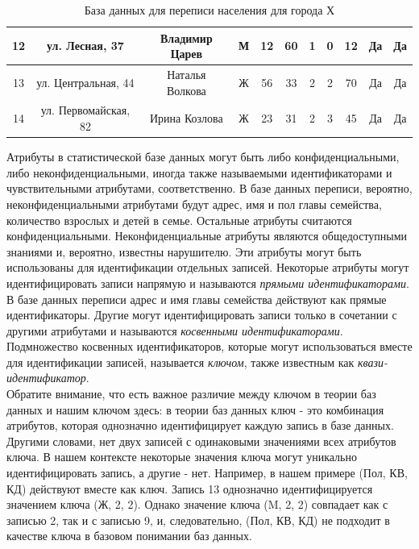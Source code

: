\begin{table}[]
\begin{tabular}{|c|c|c|c|c|c|c|c|c|c|c|}
12 & ул. Лесная, 37       & Владимир Царев    & М      & 12       & 60         & 1                   & 0                & 12          & Да              & Да                    \\ \hline
13 & ул. Центральная, 44  & Наталья Волкова    & Ж      & 56       & 33         & 2                   & 2                & 70          & Да              & Да                    \\ \hline
14 & ул. Первомайская, 82 & Ирина Козлова      & Ж      & 23       & 31         & 2                   & 3                & 45          & Да              & Да                    \\ \hline
\end{tabular}
\caption{База данных для переписи населения для города Х}
\label{tab:main}
\end{table}

Атрибуты в статистической базе данных могут быть либо конфиденциальными, либо неконфиденциальными, иногда также называемыми идентификаторами и чувствительными атрибутами, соответственно. В базе данных переписи, вероятно, неконфиденциальными атрибутами будут адрес, имя и пол главы семейства, количество взрослых и детей в семье. Остальные атрибуты считаются конфиденциальными. Неконфиденциальные атрибуты являются общедоступными знаниями и, вероятно, известны нарушителю. Эти атрибуты могут быть использованы для идентификации отдельных записей. Некоторые атрибуты могут идентифицировать записи напрямую и называются \textit{прямыми идентификаторами}. В базе данных переписи адрес и имя главы семейства действуют как прямые идентификаторы. Другие могут идентифицировать записи только в сочетании с другими атрибутами и называются \textit{косвенными идентификаторами}. Подмножество косвенных идентификаторов, которые могут использоваться вместе для идентификации записей, называется \textit{ключом}, также известным как \textit{квази-идентификатор}. 
\\

Обратите внимание, что есть важное различие между ключом в теории баз данных и нашим ключом здесь: в теории баз данных ключ - это комбинация атрибутов, которая однозначно идентифицирует каждую запись в базе данных. Другими словами, нет двух записей с одинаковыми значениями всех атрибутов ключа. В нашем контексте некоторые значения ключа могут уникально идентифицировать запись, а другие - нет. Например, в нашем примере (Пол, КВ, КД) действуют вместе как ключ. Запись 13 однозначно идентифицируется значением ключа (Ж, 2, 2). Однако значение ключа (M, 2, 2) совпадает как с записью 2, так и с записью 9, и, следовательно, (Пол, КВ, КД) не подходит в качестве ключа в базовом понимании баз данных. 
\\

